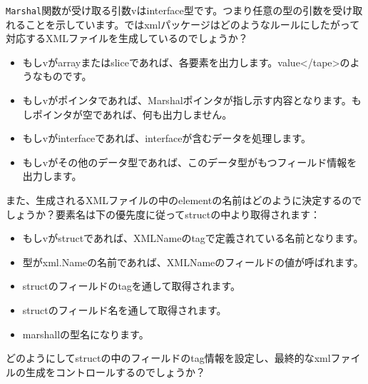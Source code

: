 \texttt{Marshal}関数が受け取る引数vはinterface{}型です。つまり任意の型の引数を受け取れることを示しています。ではxmlパッケージはどのようなルールにしたがって対応するXMLファイルを生成しているのでしょうか？

\begin{itemize}
  \item もしvがarrayまたはsliceであれば、各要素を出力します。value</tape>のようなものです。
  \item もしvがポインタであれば、Marshalポインタが指し示す内容となります。もしポインタが空であれば、何も出力しません。
  \item もしvがinterfaceであれば、interfaceが含むデータを処理します。
  \item もしvがその他のデータ型であれば、このデータ型がもつフィールド情報を出力します。
\end{itemize}

また、生成されるXMLファイルの中のelementの名前はどのように決定するのでしょうか？要素名は下の優先度に従ってstructの中より取得されます：

\begin{itemize}
  \item もしvがstructであれば、XMLNameのtagで定義されている名前となります。
  \item 型がxml.Nameの名前であれば、XMLNameのフィールドの値が呼ばれます。
  \item structのフィールドのtagを通して取得されます。
  \item structのフィールド名を通して取得されます。
  \item marshallの型名になります。
\end{itemize}

どのようにしてstructの中のフィールドのtag情報を設定し、最終的なxmlファイルの生成をコントロールするのでしょうか？

